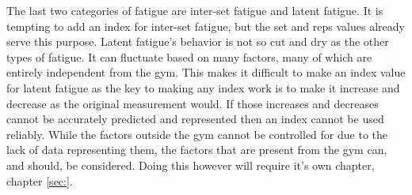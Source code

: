 The last two categories of fatigue are inter-set fatigue and latent fatigue. It is tempting to add an index for inter-set fatigue, but the set and reps values already serve this purpose. Latent fatigue's behavior is not so cut and dry as the other types of fatigue. It can fluctuate based on many factors, many of which are entirely independent from the gym. This makes it difficult to make an index value for latent fatigue as the key to making any index work is to make it increase and decrease as the original measurement would. If those increases and decreases cannot be accurately predicted and represented then an index cannot be used reliably. While the factors outside the gym cannot be controlled for due to the lack of data representing them, the factors that are present from the gym can, and should, be considered. Doing this however will require it's own chapter, chapter \ref{sec:}.

